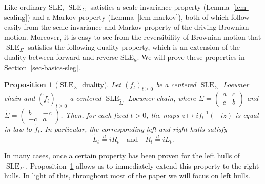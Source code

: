 \documentclass[11pt]{article}
\theoremstyle{plain}
\newtheorem{prop}[thm]{Proposition}
\theoremstyle{definition}
\numberwithin{equation}{section}
\newcommand{\eqb}{\begin{equation}}
\newcommand{\eqe}{\end{equation}}
\newcommand{\eqD}{\overset{d}{=}}
\newcommand{\wt}{\widetilde}
\newcommand{\SLEG}{{\operatorname{SLE}}_\Sigma}
\newcommand{\SLEGt}{{\operatorname{SLE}}_{\wt\Sigma}}
\begin{document}
Like ordinary SLE, $\SLEG$ satisfies a scale invariance property (Lemma~\ref{lem-scaling}) and a Markov property (Lemma~\ref{lem-markov}), both of which follow easily from the scale invariance and Markov property of the driving Brownian motion.  Moreover, it is easy to see from the reversibility of Brownian motion that $\SLEG$ satisfies the following duality property, which is an extension of the duality between forward and reverse SLE$_\kappa$. We will prove these properties in Section~\ref{sec-basics-sleg}.  

\begin{prop}[$\SLEG$ duality] \label{prop-duality}
Let $(f_t)_{t \geq 0}$ be a centered $\SLEG$ Loewner chain and $(\wt f_t)_{t \geq 0}$ a centered $\SLEGt$ Loewner chain, where  $\Sigma = \begin{pmatrix} a&c\\c&b\end{pmatrix}$ and  $\wt \Sigma = \begin{pmatrix} b&-c\\-c&a\end{pmatrix}$.  Then, for each fixed $t>0$, the maps $z \mapsto i f_t^{-1}(-i z)$ is equal in law to $\wt f_t$.
In particular, the corresponding left and right hulls satisfy
\eqb
\wt L_t \eqD i R_t \quad \text{and} \quad \wt R_t \eqD i L_t .
\eqe
\end{prop}


In many cases, once a certain property has been proven for the left hulls of $\SLEG$, Proposition~\ref{prop-duality} allows us to immediately extend this property to the right hulls. In light of this, throughout most of the paper we will focus on left hulls.
\end{document}
